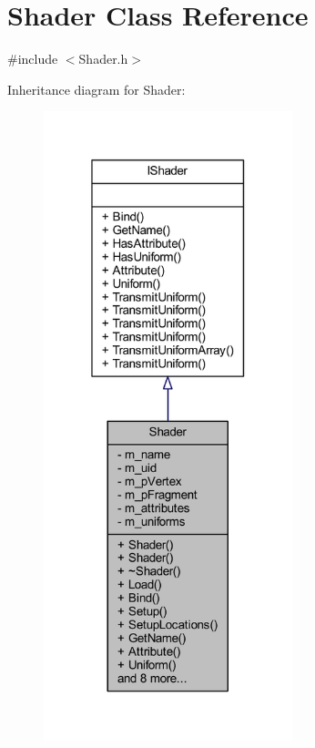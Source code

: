 \hypertarget{class_shader}{}\section{Shader Class Reference}
\label{class_shader}


{\ttfamily \#include $<$Shader.\+h$>$}



Inheritance diagram for Shader\+:\nopagebreak
\begin{figure}[H]
\begin{center}
\leavevmode
\includegraphics[width=205pt]{class_shader__inherit__graph}
\end{center}
\end{figure}


